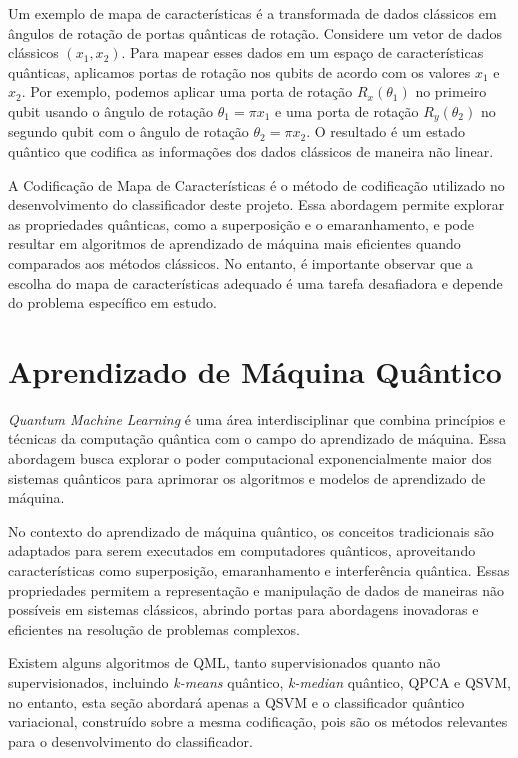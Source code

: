 Um exemplo de mapa de características é a transformada de dados clássicos em ângulos de rotação de portas quânticas de rotação. Considere um vetor de dados clássicos $(x_1, x_2)$. Para mapear esses dados em um espaço de características quânticas, aplicamos portas de rotação nos qubits de acordo com os valores $x_1$ e $x_2$. Por exemplo, podemos aplicar uma porta de rotação $R_x(\theta_1)$ no primeiro qubit usando o ângulo de rotação $\theta_1 = \pi x_1$ e uma porta de rotação $R_y(\theta_2)$ no segundo qubit com o ângulo de rotação $\theta_2 = \pi x_2$. O resultado é um estado quântico que codifica as informações dos dados clássicos de maneira não linear.

A Codificação de Mapa de Características é o método de codificação utilizado no desenvolvimento do classificador deste projeto. Essa abordagem permite explorar as propriedades quânticas, como a superposição e o emaranhamento, e pode resultar em algoritmos de aprendizado de máquina mais eficientes quando comparados aos métodos clássicos. No entanto, é importante observar que a escolha do mapa de características adequado é uma tarefa desafiadora e depende do problema específico em estudo.

\section{Aprendizado de Máquina Quântico}

\textit{Quantum Machine Learning} é uma área interdisciplinar que combina princípios e técnicas da computação quântica com o campo do aprendizado de máquina. Essa abordagem busca explorar o poder computacional exponencialmente maior dos sistemas quânticos para aprimorar os algoritmos e modelos de aprendizado de máquina.

No contexto do aprendizado de máquina quântico, os conceitos tradicionais são adaptados para serem executados em computadores quânticos, aproveitando características como superposição, emaranhamento e interferência quântica. Essas propriedades permitem a representação e manipulação de dados de maneiras não possíveis em sistemas clássicos, abrindo portas para abordagens inovadoras e eficientes na resolução de problemas complexos.

Existem alguns algoritmos de QML, tanto supervisionados quanto não supervisionados, incluindo \textit{k-means} quântico, \textit{k-median} quântico, QPCA e QSVM, no entanto, esta seção abordará apenas a QSVM e o classificador quântico variacional, construído sobre a mesma codificação, pois são os métodos relevantes para o desenvolvimento do classificador.

